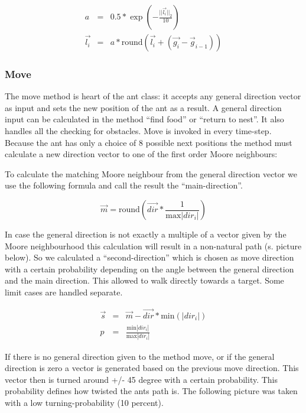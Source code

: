 \documentclass[11pt]{article}
\begin{document}
\begin{eqnarray}
a & = & 0.5 * \exp \left(-\frac{||\vec{l_i}||_2}{10}\right) \\
\vec{l_i} & = & a * \text{round} \left(\vec{l_i}  + \left(\vec{g_i} - {\vec{g}_{i-1}}\right)\right)
\end{eqnarray}

\subsubsection{Move} 
The move method is heart of the ant class: it accepts any general direction vector as input and sets the new position of the ant as a result. A general direction input can be calculated in the method “find food” or “return to nest”. It also handles all the checking for obstacles. Move is invoked in every time-step. Because the ant has only a choice of 8 possible next positions the method must calculate a new direction vector to one of the first order Moore neighbours:


To calculate the matching Moore neighbour from the general direction vector we use the following formula and call the result the “main-direction”.

\begin{equation}
\vec{m} = \text{round}\left(\vec{dir}*\frac{1}{\text{max}|dir_i|}\right)
\end{equation}

In case the general direction is not exactly a multiple of a vector given by the Moore neighbourhood this calculation will result in a non-natural path (s. picture below). So we calculated a “second-direction” which is chosen as move direction with a certain probability depending on the angle between the general direction and the main direction. This allowed to walk directly towards a target. Some limit cases are handled separate.

\begin{eqnarray}
\vec{s} & = & \vec{m}-\vec{dir} * \text{min} \left( |dir_i| \right) \\ 
p & = & \frac{\text{min}|dir_i|}{\text{max} |dir_i|}
\end{eqnarray}

If there is no general direction given to the method move, or if the general direction is zero a vector is generated based on the previous move direction. This vector then is turned around +/- 45 degree with a certain probability. This probability defines how twisted the ants path is. The following picture was taken with a low turning-probability (10 percent).
\end{document}
